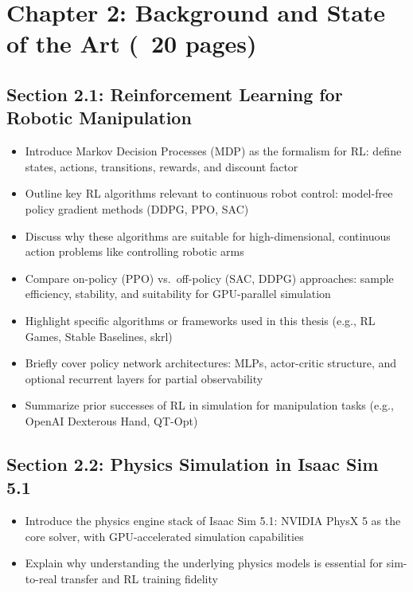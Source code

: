 \section{Chapter 2: Background and State of the Art (~20 pages)}

\subsection{Section 2.1: Reinforcement Learning for Robotic Manipulation}
\begin{itemize}
    \item Introduce Markov Decision Processes (MDP) as the formalism for RL: define states, actions, transitions, rewards, and discount factor
    \item Outline key RL algorithms relevant to continuous robot control: model-free policy gradient methods (DDPG, PPO, SAC)
    \item Discuss why these algorithms are suitable for high-dimensional, continuous action problems like controlling robotic arms
    \item Compare on-policy (PPO) vs.\ off-policy (SAC, DDPG) approaches: sample efficiency, stability, and suitability for GPU-parallel simulation
    \item Highlight specific algorithms or frameworks used in this thesis (e.g., RL Games, Stable Baselines, skrl)
    \item Briefly cover policy network architectures: MLPs, actor-critic structure, and optional recurrent layers for partial observability
    \item Summarize prior successes of RL in simulation for manipulation tasks (e.g., OpenAI Dexterous Hand, QT-Opt)
\end{itemize}

\subsection{Section 2.2: Physics Simulation in Isaac Sim 5.1}
\begin{itemize}
    \item Introduce the physics engine stack of Isaac Sim 5.1: NVIDIA PhysX 5 as the core solver, with GPU-accelerated simulation capabilities
    \item Explain why understanding the underlying physics models is essential for sim-to-real transfer and RL training fidelity
\end{itemize}

